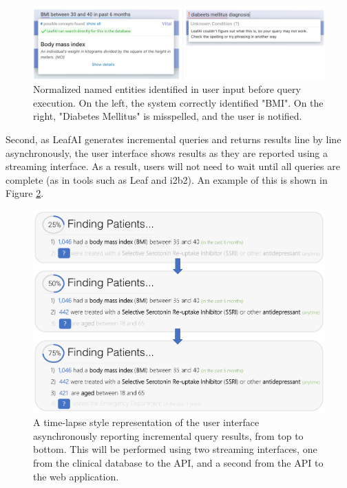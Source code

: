 \documentclass[../main.tex]{subfiles}
\begin{document}
\begin{figure}[h!]
  \centering
  \includegraphics[scale=0.55]{Figures/8_web_application/leafai_normalization.png}  
  \caption{Normalized named entities identified in user input before query execution. On the left, the system correctly identified "BMI". On the right, "Diabetes Mellitus" is misspelled, and the user is notified.}
\label{fig_leafai_mouse_hover}
\end{figure}

Second, as LeafAI generates incremental queries and returns results line by line asynchronously, the user interface shows results as they are reported using a streaming interface. As a result, users will not need to wait until all queries are complete (as in tools such as Leaf and i2b2). An example of this is shown in Figure \ref{fig_leafai_query_progress}.

\begin{figure}[h!]
  \centering
  \includegraphics[scale=0.5]{Figures/8_web_application/leafai_query_progress.pdf}  
  \caption{A time-lapse style representation of the user interface asynchronously reporting incremental query results, from top to bottom. This will be performed using two streaming interfaces, one from the clinical database to the API, and a second from the API to the web application.}
\label{fig_leafai_query_progress}
\end{figure}
\end{document}
